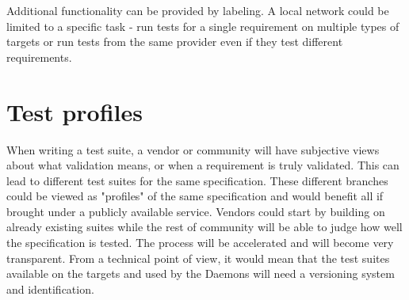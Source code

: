 Additional functionality can be provided by labeling. A local network could be limited to a specific task - run tests for a single requirement on multiple types of targets or run tests from the same provider even if they test different requirements. 

\section{Test profiles}

When writing a test suite, a vendor or community will have subjective views about what validation means, or when a requirement is truly validated. This can lead to different test suites for the same specification. These different branches could be viewed as "profiles" of the same specification and would benefit all if brought under a publicly available service. Vendors could start by building on already existing suites while the rest of community will be able to judge how well the specification is tested. The process will be accelerated and will become very transparent. From a technical point of view, it would mean that the test suites available on the targets and used by the Daemons will need a versioning system and identification.

